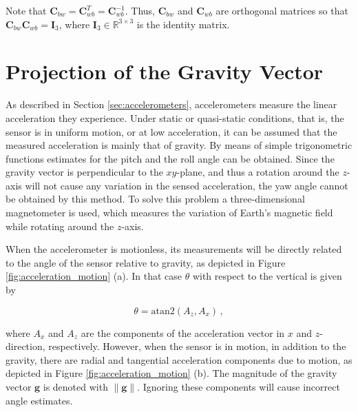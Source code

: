 \noindent
Note that $\mathbf{C}_{bw} = \mathbf{C}^T_{wb} = \mathbf{C}^{-1}_{wb}$. Thus, $\mathbf{C}^{ }_{bw}$ and $\mathbf{C}_{wb}$ are orthogonal matrices so that $\mathbf{C}^{ }_{bw} \mathbf{C}_{wb} = \mathbf{I}_3$, where $\mathbf{I}_3 \in \mathbb{R}^{3 \times 3}$ is the identity matrix.

\section{Projection of the Gravity Vector}\label{sec:projection_gravity}


As described in Section \ref{sec:accelerometers}, accelerometers measure the linear acceleration they experience. Under static or quasi-static conditions, that is, the sensor is in uniform motion, or at low acceleration, it can be assumed that the measured acceleration is mainly that of gravity. By means of simple trigonometric functions estimates for the pitch and the roll angle can be obtained. Since the gravity vector is perpendicular to the $xy$-plane, and thus a rotation around the $z$-axis will not cause any variation in the sensed acceleration, the yaw angle cannot be obtained by this method. To solve this problem a three-dimensional magnetometer is used, which measures the variation of Earth's magnetic field while rotating around the $z$-axis.

When the accelerometer is motionless, its measurements will be directly related to the angle of the sensor relative to gravity, as depicted in Figure \ref{fig:acceleration_motion} (a). In that case $\theta$ with respect to the vertical is given by

\begin{equation} \label{eq:projection_gravity}
  \theta = \mbox{atan}2(A_z, A_x)\,,
\end{equation}

\noindent
where $A_x$ and $A_z$ are the components of the acceleration vector in $x$ and $z$-direction, respectively. However, when the sensor is in motion, in addition to the gravity, there are radial and tangential acceleration components due to motion, as depicted in Figure \ref{fig:acceleration_motion} (b). The magnitude of the gravity vector $\mathbf{g}$ is denoted with $\|\mathbf{g}\|$. Ignoring these components will cause incorrect angle estimates.

